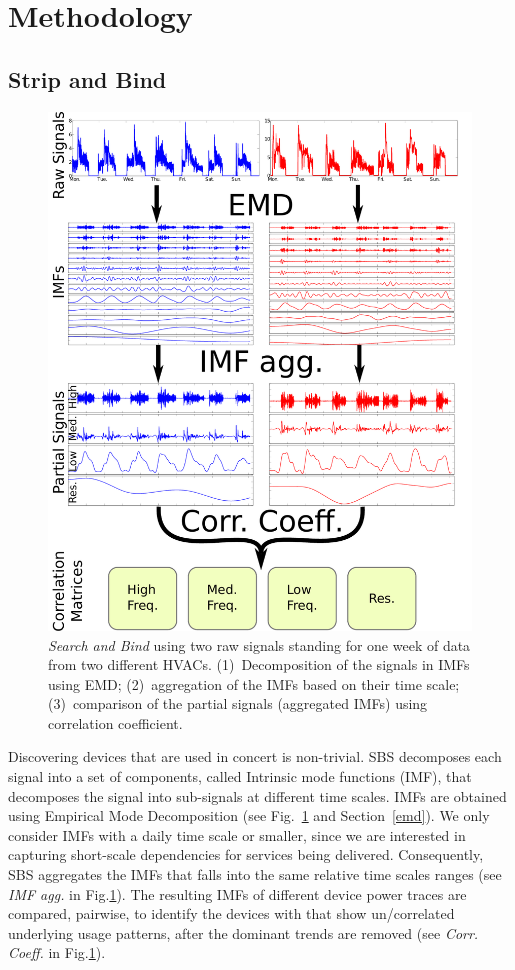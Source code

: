 
\section{Methodology}

\subsection{Strip and Bind} \label{methodo:est}

\begin{figure}[t!]
 \includegraphics[width=.5\textwidth]{img/estimator.pdf}
 \caption{\emph{Search and Bind} using two raw signals standing for one week of data from two different HVACs. (1)~Decomposition of the signals in IMFs using EMD; (2)~aggregation of the IMFs based on their time scale; (3)~comparison of the partial signals (aggregated IMFs) using correlation coefficient.}
 \label{fig:diagram1}
\end{figure}

Discovering devices that are used in concert is non-trivial.  
SBS decomposes each signal into a set of components, called Intrinsic mode functions (IMF), 
that decomposes the signal into sub-signals at different time scales.  IMFs are obtained using 
Empirical Mode Decomposition (see Fig.~\ref{fig:diagram1} and Section~\ref{emd}).
We only consider IMFs with a daily time scale or smaller, since we are interested in capturing short-scale dependencies
for services being delivered.
Consequently, SBS aggregates the IMFs that falls into the same relative time scales ranges (see \emph{IMF agg.} in Fig.\ref{fig:diagram1}).
The resulting IMFs of different device power traces are compared, pairwise, to identify the devices 
with that show un/correlated underlying usage patterns, after the dominant trends are removed (see \emph{Corr. Coeff.} in Fig.\ref{fig:diagram1}). 


